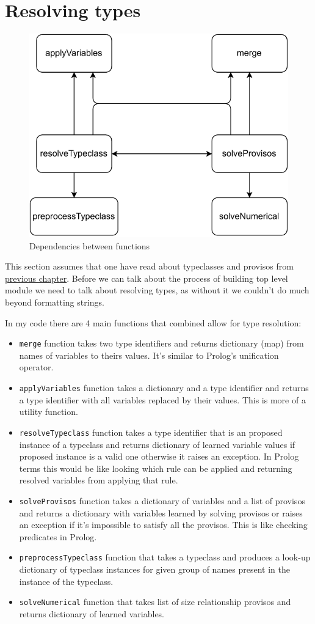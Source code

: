 \documentclass[14pt]{report}
\begin{document}
\newpage
\section{Resolving types}
\begin{figure}[!h]
    \centering
    \caption{Dependencies between functions}

    \includegraphics[width=0.8\columnwidth]{pdfExports/LargeMapResolve.pdf}
\end{figure}
This section assumes that one have read about typeclasses and provisos from \hyperref[sec:Typeclasses]{previous chapter}.
Before we can talk about the process of building top level module we need to talk about resolving types, as without it we couldn't do much beyond formatting strings.
\par
In my code there are 4 main functions that combined allow for type resolution:
\begin{itemize}
    \item \verb!merge! function takes two type identifiers and returns dictionary (map) from names of variables to theirs values. It's similar to Prolog's unification operator.
    \item \verb!applyVariables! function takes a dictionary and a type identifier and returns a type identifier with all variables replaced by their values. This is more of a utility function.
    \item \verb!resolveTypeclass! function takes a type identifier that is an proposed instance of a typeclass and returns dictionary of learned variable values if proposed instance is a valid one otherwise it raises an exception. In Prolog terms this would be like looking which rule can be applied and returning resolved variables from applying that rule.
    \item \verb!solveProvisos! function takes a dictionary of variables and a list of provisos and returns a dictionary with variables learned by solving provisos or raises an exception if it's impossible to satisfy all the provisos. This is like checking predicates in Prolog.
    \item \verb!preprocessTypeclass! function that takes a typeclass and produces a look-up dictionary of typeclass instances for given group of names present in the instance of the typeclass.
    \item \verb!solveNumerical! function that takes list of size relationship provisos and returns dictionary of learned variables.
\end{itemize}
\end{document}
